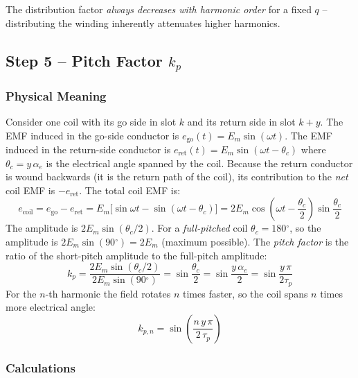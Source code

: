 \documentclass[12pt,a4paper]{article}
\newcommand{\degree}{\ensuremath{^{\circ}}}
\begin{document}
\noindent The distribution factor \emph{always decreases with harmonic order}
for a fixed $q$ -- distributing the winding inherently attenuates higher harmonics.

\subsection{Step 5 -- Pitch Factor $k_p$}

\subsubsection{Physical Meaning}

Consider one coil with its go side in slot $k$ and its return side in
slot $k+y$.
The EMF induced in the go-side conductor is
$e_\text{go}(t) = E_m \sin(\omega t)$.
The EMF induced in the return-side conductor is
$e_\text{ret}(t) = E_m \sin(\omega t - \theta_c)$
where $\theta_c = y\,\alpha_e$ is the electrical angle spanned by the coil.
Because the return conductor is wound backwards (it is the return path of the
coil), its contribution to the \emph{net} coil EMF is $-e_\text{ret}$.
The total coil EMF is:
\begin{equation}
  e_\text{coil} = e_\text{go} - e_\text{ret}
                = E_m\bigl[\sin\omega t - \sin(\omega t - \theta_c)\bigr]
                = 2E_m\cos\!\left(\omega t - \frac{\theta_c}{2}\right)
                  \sin\!\frac{\theta_c}{2}
\end{equation}
The amplitude is $2E_m\sin(\theta_c/2)$.
For a \emph{full-pitched} coil $\theta_c = 180\degree$, so the amplitude is
$2E_m\sin(90\degree)=2E_m$ (maximum possible).
The \emph{pitch factor} is the ratio of the short-pitch amplitude to the
full-pitch amplitude:
\begin{equation}
  k_p = \frac{2E_m\sin(\theta_c/2)}{2E_m\sin(90\degree)}
      = \sin\!\frac{\theta_c}{2}
      = \sin\!\frac{y\,\alpha_e}{2}
      = \sin\!\frac{y\,\pi}{2\tau_p}
\end{equation}
For the $n$-th harmonic the field rotates $n$ times faster, so the coil
spans $n$ times more electrical angle:
\begin{equation}
  \boxed{k_{p,n} = \sin\!\left(\frac{n\,y\,\pi}{2\,\tau_p}\right)}
  \label{eq:kp_q1}
\end{equation}

\subsubsection{Calculations}
\end{document}
